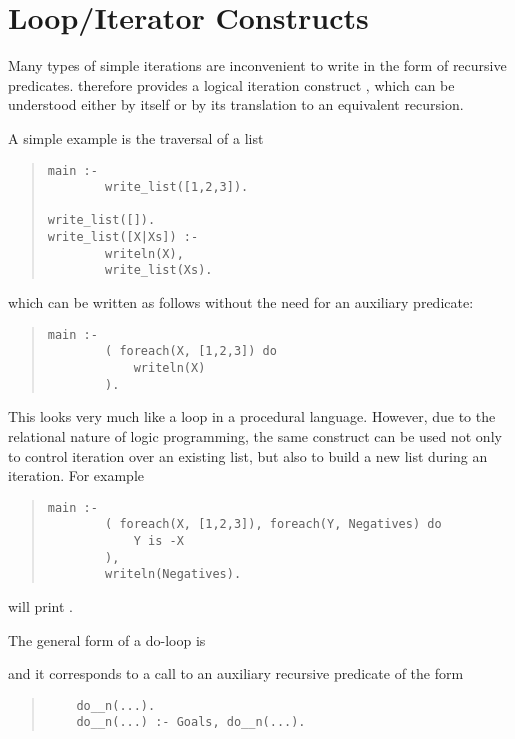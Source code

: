 \section{Loop/Iterator Constructs}
\label{doloops}
Many types of simple iterations are inconvenient to write in the
form of recursive predicates. {\eclipse} therefore provides a logical
iteration construct
,
which can be understood either by itself
or by its translation to an equivalent recursion.

A simple example is the traversal of a list
\begin{quote}
\begin{verbatim}
main :-
        write_list([1,2,3]).

write_list([]).
write_list([X|Xs]) :-
        writeln(X),
        write_list(Xs).
\end{verbatim}
\end{quote}
which can be written as follows without the need for an auxiliary predicate:
\begin{quote}
\begin{verbatim}
main :-
        ( foreach(X, [1,2,3]) do
            writeln(X)
        ).
\end{verbatim}
\end{quote}
This looks very much like a loop in a procedural language. However,
due to the relational nature of logic programming, the same 
construct can be used not only to control iteration over an existing list,
but also to build a new list during an iteration. For example
\begin{quote}
\begin{verbatim}
main :-
        ( foreach(X, [1,2,3]), foreach(Y, Negatives) do
            Y is -X
        ),
        writeln(Negatives).
\end{verbatim}
\end{quote}
will print \notation{[-1, -2, -3]}.

The general form of a do-loop is
\begin{quote}
\end{quote}
and it corresponds to a call to an auxiliary recursive
predicate of the form
\begin{quote}
\begin{verbatim}
    do__n(...).
    do__n(...) :- Goals, do__n(...).
\end{verbatim}
\end{quote}

